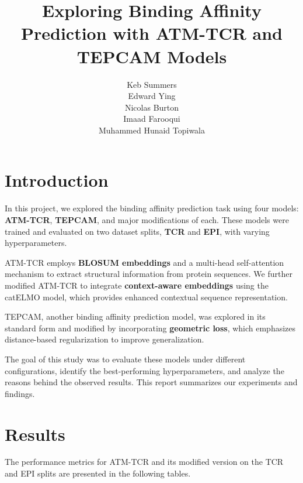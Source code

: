 \documentclass[11pt,a4paper]{article}
\title{Exploring Binding Affinity Prediction with ATM-TCR and TEPCAM Models}
\author{
    Keb Summers \\ 
    Edward Ying \\ 
    Nicolas Burton \\ 
    Imaad Farooqui \\ 
    Muhammed Hunaid Topiwala
}
\date{}
\begin{document}
\maketitle

\section{Introduction}
In this project, we explored the binding affinity prediction task using four models: \textbf{ATM-TCR}, \textbf{TEPCAM}, and major modifications of each. These models were trained and evaluated on two dataset splits, \textbf{TCR} and \textbf{EPI}, with varying hyperparameters.

\bigskip

ATM-TCR employs \textbf{BLOSUM embeddings} and a multi-head self-attention mechanism to extract structural information from protein sequences. We further modified ATM-TCR to integrate \textbf{context-aware embeddings} using the catELMO model, which provides enhanced contextual sequence representation.

\bigskip

TEPCAM, another binding affinity prediction model, was explored in its standard form and modified by incorporating \textbf{geometric loss}, which emphasizes distance-based regularization to improve generalization.

\bigskip

The goal of this study was to evaluate these models under different configurations, identify the best-performing hyperparameters, and analyze the reasons behind the observed results. This report summarizes our experiments and findings.


\section{Results}
The performance metrics for ATM-TCR and its modified version on the TCR and EPI splits are presented in the following tables.
\end{document}
